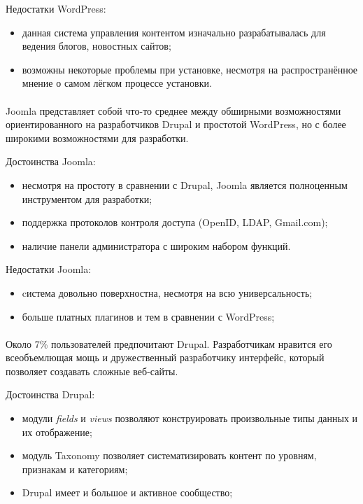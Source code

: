 Недостатки WordPress:
\begin{itemize}
\item
  данная система управления контентом изначально разрабатывалась для
  ведения блогов, новостных сайтов; 
\item
  возможны некоторые проблемы при установке,
  несмотря на распространённое мнение о самом лёгком процессе установки.
\end{itemize}

\paragraph{} 
Joomla представляет собой что-то среднее между обширными возможностями
ориентированного на разработчиков Drupal и простотой WordPress,
но с более широкими возможностями для разработки.

Достоинства Joomla:
\begin{itemize}
\item
  несмотря на простоту в сравнении с Drupal, Joomla является полноценным инструментом для разработки;
\item
  поддержка протоколов контроля доступа (OpenID, LDAP, Gmail.com);
\item
  наличие панели администратора с широким набором функций.
\end{itemize}

Недостатки Joomla:
\begin{itemize}
\item
  cистема довольно поверхностна, несмотря на всю универсальность;
\item
  больше платных плагинов и тем в сравнении с WordPress;
\end{itemize}

\paragraph{}
Около 7\% пользователей предпочитают Drupal. Разработчикам нравится его всеобъемлющая мощь
и дружественный разработчику интерфейс, который позволяет создавать сложные веб-сайты.

Достоинства Drupal:
\begin{itemize}
\item
  модули \textit{fields} и \textit{views} позволяют конструировать произвольные типы данных и их отображение;
\item
  модуль Taxonomy позволяет систематизировать контент по уровням, признакам и категориям;
\item
  Drupal имеет и большое и активное сообщество;
\end{itemize}

